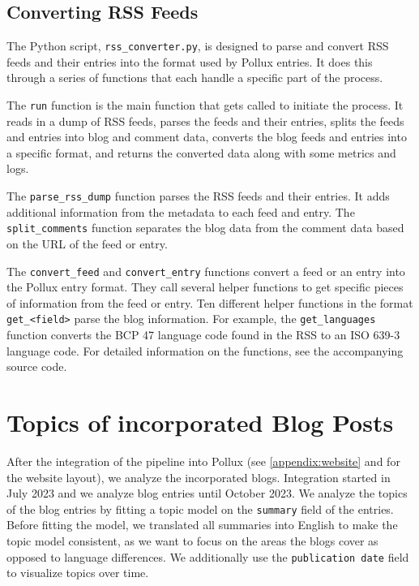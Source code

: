 \documentclass{article}
\begin{document}
\subsection{Converting RSS Feeds}

The Python script, \texttt{rss\_converter.py}, is designed to parse and convert RSS feeds and their entries into the format used by Pollux entries. It does this through a series of functions that each handle a specific part of the process.

The \texttt{run} function is the main function that gets called to initiate the process. It reads in a dump of RSS feeds, parses the feeds and their entries, splits the feeds and entries into blog and comment data, converts the blog feeds and entries into a specific format, and returns the converted data along with some metrics and logs.

The \texttt{parse\_rss\_dump} function parses the RSS feeds and their entries. It adds additional information from the metadata to each feed and entry.
The \texttt{split\_comments} function separates the blog data from the comment data based on the URL of the feed or entry.

The \texttt{convert\_feed} and \texttt{convert\_entry} functions convert a feed or an entry into the Pollux entry format. They call several helper functions to get specific pieces of information from the feed or entry.
Ten different helper functions in the format \texttt{get\_<field>} parse the blog information. For example, the \texttt{get\_languages} function converts the BCP 47 language code found in the RSS to an ISO 639-3 language code. For detailed information on the functions, see the accompanying source code.

\section{Topics of incorporated Blog Posts}\label{sec:Visualization}
After the integration of the pipeline into Pollux (see \autoref{appendix:website} and \citet{czolkoss-hettwerPolitikwissenschaftlicheBlogsSichtbar2023} for the website layout), we analyze the incorporated blogs. Integration started in July 2023 and we analyze blog entries until October 2023. We analyze the topics of the blog entries by fitting a topic model on the \texttt{summary} field of the entries. Before fitting the model, we translated all summaries into English to make the topic model consistent, as we want to focus on the areas the blogs cover as opposed to language differences. We additionally use the \texttt{publication date} field to visualize topics over time.
\end{document}
